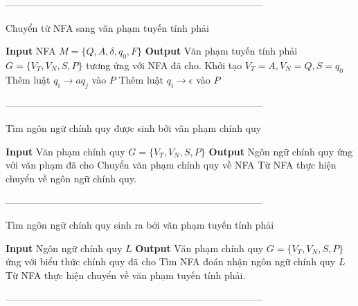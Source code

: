 \documentclass[12pt,a4paper]{article}
\begin{document}
--------------------------------------------------------------------------------\\
\begin{algorithm}[H]
\caption{Chuyển từ NFA sang văn phạm tuyến tính phải}
\begin{algorithmic} 
\STATE \textbf{Input} NFA $M = \{Q, A, \delta, q_0, F\}$
\STATE \textbf{Output} Văn phạm tuyến tính phải $G = \{V_T, V_N, S, P\}$ tương ứng với NFA đã cho.
\STATE Khởi tạo $V_T = A, V_N = Q, S = q_0$
\STATE Thêm luật $q_i \rightarrow aq_j$ vào $P$
\ENDFOR
\ENDFOR
\ENDFOR
{}
\STATE Thêm luật $q_i \rightarrow \epsilon$ vào $P$
\ENDFOR
\end{algorithmic}
\end{algorithm}

--------------------------------------------------------------------------------\\
\begin{algorithm}[H]
\caption{Tìm ngôn ngữ chính quy được sinh bởi văn phạm chính quy}
\begin{algorithmic} 
\STATE \textbf{Input} Văn phạm chính quy $G = \{V_T, V_N, S, P\}$
\STATE \textbf{Output} Ngôn ngữ chính quy ứng với văn phạm đã cho
\STATE Chuyển văn phạm chính quy về NFA
\STATE Từ NFA thực hiện chuyển về ngôn ngữ chính quy.
\end{algorithmic}
\end{algorithm}

--------------------------------------------------------------------------------\\
\begin{algorithm}[H]
\caption{Tìm ngôn ngữ chính quy sinh ra bởi văn phạm tuyến tính phải}
\begin{algorithmic} 
\STATE \textbf{Input} Ngôn ngữ chính quy $L$
\STATE \textbf{Output} Văn phạm chính quy $G = \{V_T, V_N, S, P\}$ ứng với biểu thức chính quy đã cho
\STATE Tìm NFA đoán nhận ngôn ngữ chính quy $L$
\STATE Từ NFA thực hiện chuyển về văn phạm tuyến tính phải.
\end{algorithmic}
\end{algorithm}

--------------------------------------------------------------------------------\\
\end{document}
